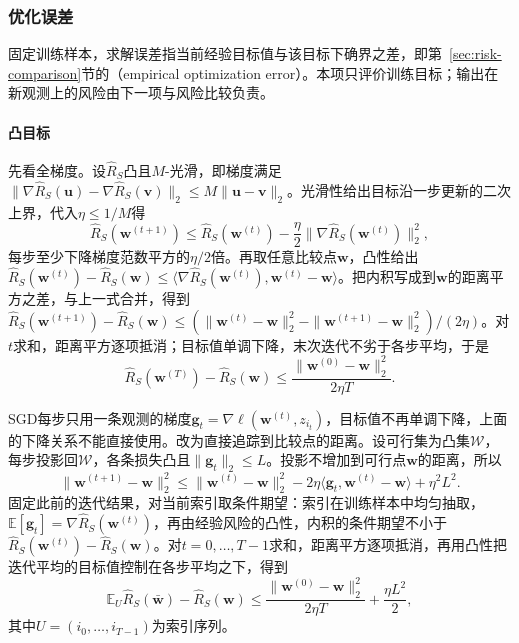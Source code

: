 \subsubsection{优化误差}
\label{sec:gd-optimization-error}

固定训练样本，求解误差指当前经验目标值与该目标下确界之差，即第~\ref{sec:risk-comparison}节的（empirical optimization error）。本项只评价训练目标；输出在新观测上的风险由下一项与风险比较负责。

\paragraph{凸目标}

先看全梯度。设$\hat R_S$凸且$M$-光滑，即梯度满足$\|\nabla\hat R_S(\bm u)-\nabla\hat R_S(\bm v)\|_2\leq M\|\bm u-\bm v\|_2$。光滑性给出目标沿一步更新的二次上界，代入$\eta\leq1/M$得
\[
 \hat R_S(\bm w^{(t+1)})\leq\hat R_S(\bm w^{(t)})-\frac\eta2\|\nabla\hat R_S(\bm w^{(t)})\|_2^2,
\]
每步至少下降梯度范数平方的$\eta/2$倍。再取任意比较点$\bm w$，凸性给出$\hat R_S(\bm w^{(t)})-\hat R_S(\bm w)\leq\langle\nabla\hat R_S(\bm w^{(t)}),\bm w^{(t)}-\bm w\rangle$。把内积写成到$\bm w$的距离平方之差，与上一式合并，得到$\hat R_S(\bm w^{(t+1)})-\hat R_S(\bm w)\leq(\|\bm w^{(t)}-\bm w\|_2^2-\|\bm w^{(t+1)}-\bm w\|_2^2)/(2\eta)$。对$t$求和，距离平方逐项抵消；目标值单调下降，末次迭代不劣于各步平均，于是
\begin{equation}
 \hat R_S(\bm w^{(T)})-\hat R_S(\bm w)\leq\frac{\|\bm w^{(0)}-\bm w\|_2^2}{2\eta T}.
 \label{eq:gd-convex-optimization}
\end{equation}

SGD每步只用一条观测的梯度$\bm g_t=\nabla\ell(\bm w^{(t)},z_{i_t})$，目标值不再单调下降，上面的下降关系不能直接使用。改为直接追踪到比较点的距离。设可行集为凸集$\mathcal W$，每步投影回$\mathcal W$，各条损失凸且$\|\bm g_t\|_2\leq L$。投影不增加到可行点$\bm w$的距离，所以
\[
 \|\bm w^{(t+1)}-\bm w\|_2^2\leq\|\bm w^{(t)}-\bm w\|_2^2-2\eta\langle\bm g_t,\bm w^{(t)}-\bm w\rangle+\eta^2L^2.
\]
固定此前的迭代结果，对当前索引取条件期望：索引在训练样本中均匀抽取，$\mathbb E[\bm g_t]=\nabla\hat R_S(\bm w^{(t)})$，再由经验风险的凸性，内积的条件期望不小于$\hat R_S(\bm w^{(t)})-\hat R_S(\bm w)$。对$t=0,\ldots,T-1$求和，距离平方逐项抵消，再用凸性把迭代平均的目标值控制在各步平均之下，得到
\begin{equation}
 \mathbb E_U\hat R_S(\bar{\bm w})-\hat R_S(\bm w)
 \leq\frac{\|\bm w^{(0)}-\bm w\|_2^2}{2\eta T}+\frac{\eta L^2}{2},
 \label{eq:sgd-convex-optimization}
\end{equation}
其中$U=(i_0,\ldots,i_{T-1})$为索引序列。

